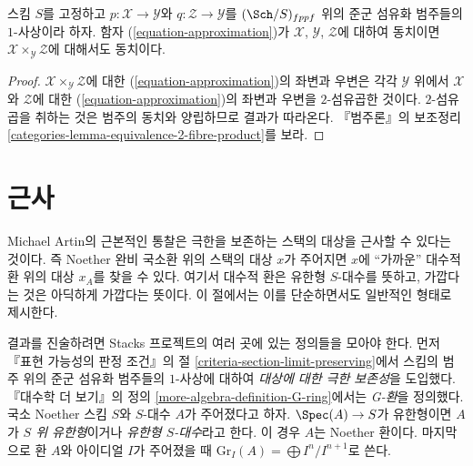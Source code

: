 \begin{lemma}
\label{lemma-fibre-product-effective}
스킴 $S$를 고정하고 $p : \mathcal{X} \to \mathcal{Y}$와
$q : \mathcal{Z} \to \mathcal{Y}$를 $(\Sch/S)_{fppf}$ 위의
준군 섬유화 범주들의 $1$-사상이라 하자. 함자
(\ref{equation-approximation})가 $\mathcal{X}$, $\mathcal{Y}$,
$\mathcal{Z}$에 대하여 동치이면
$\mathcal{X} \times_\mathcal{Y} \mathcal{Z}$에 대해서도 동치이다.
\end{lemma}

\begin{proof}
$\mathcal{X} \times_\mathcal{Y} \mathcal{Z}$에 대한
(\ref{equation-approximation})의 좌변과 우변은 각각
$\mathcal{Y}$ 위에서 $\mathcal{X}$와 $\mathcal{Z}$에 대한
(\ref{equation-approximation})의 좌변과 우변을 $2$-섬유곱한 것이다.
$2$-섬유곱을 취하는 것은 범주의 동치와 양립하므로 결과가 따라온다.
『범주론』의 보조정리
\ref{categories-lemma-equivalence-2-fibre-product}를 보라.
\end{proof}






\section{근사}
\label{section-approximation}

\noindent
Michael Artin의 근본적인 통찰은 극한을 보존하는 스택의 대상을 근사할
수 있다는 것이다. 즉 Noether 완비 국소환 위의 스택의 대상 $x$가
주어지면 $x$에 ``가까운'' 대수적 환 위의 대상 $x_A$를 찾을 수 있다.
여기서 대수적 환은 유한형 $S$-대수를 뜻하고, 가깝다는 것은 아딕하게
가깝다는 뜻이다. 이 절에서는 이를 단순하면서도 일반적인 형태로 제시한다.

\medskip\noindent
결과를 진술하려면 Stacks 프로젝트의 여러 곳에 있는 정의들을 모아야 한다.
먼저 『표현 가능성의 판정 조건』의 절
\ref{criteria-section-limit-preserving}에서 스킴의 범주 위의
준군 섬유화 범주들의 $1$-사상에 대하여 {\it 대상에 대한 극한 보존성}을
도입했다. 『대수학 더 보기』의 정의
\ref{more-algebra-definition-G-ring}에서는 {\it G-환}을 정의했다.
국소 Noether 스킴 $S$와 $S$-대수 $A$가 주어졌다고 하자.
$\Spec(A) \to S$가 유한형이면 $A$가 {\it $S$ 위 유한형}이거나
{\it 유한형 $S$-대수}라고 한다. 이 경우 $A$는 Noether 환이다.
마지막으로 환 $A$와 아이디얼 $I$가 주어졌을 때
$\text{Gr}_I(A) = \bigoplus I^n/I^{n + 1}$로 쓴다.


